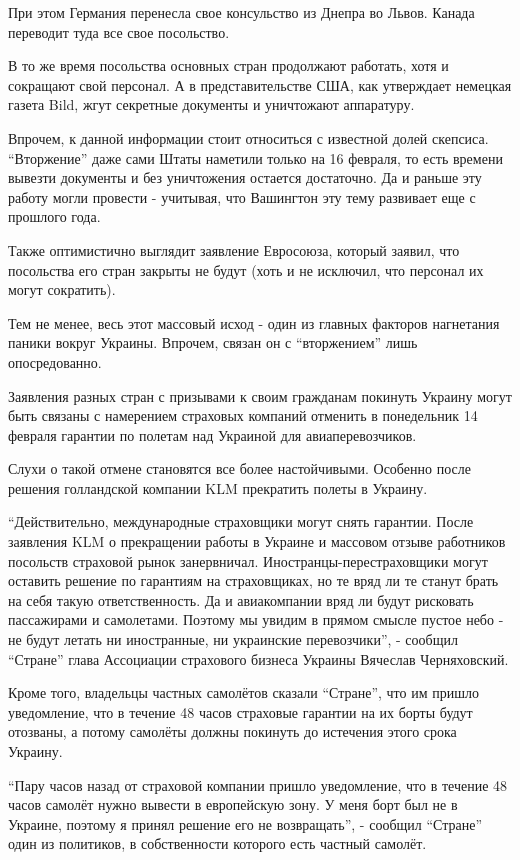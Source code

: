 При этом Германия перенесла свое консульство из Днепра во Львов. Канада
переводит туда все свое посольство.

В то же время посольства основных стран продолжают работать, хотя и сокращают
свой персонал. А в представительстве США, как утверждает немецкая газета Bild,
жгут секретные документы и уничтожают аппаратуру.

Впрочем, к данной информации стоит относиться с известной долей скепсиса.
\enquote{Вторжение} даже сами Штаты наметили только на 16 февраля, то есть
времени вывезти документы и без уничтожения остается достаточно. Да и раньше
эту работу могли провести - учитывая, что Вашингтон эту тему развивает еще с
прошлого года. 

Также оптимистично выглядит заявление Евросоюза, который заявил, что посольства
его стран закрыты не будут (хоть и не исключил, что персонал их могут
сократить). 

Тем не менее, весь этот массовый исход - один из главных факторов нагнетания
паники вокруг Украины. Впрочем, связан он с \enquote{вторжением} лишь опосредованно.

Заявления разных стран с призывами к своим гражданам покинуть Украину могут
быть связаны с намерением страховых компаний отменить в понедельник 14 февраля
гарантии по полетам над Украиной для авиаперевозчиков.

Слухи о такой отмене становятся все более настойчивыми. Особенно после решения
голландской компании KLM прекратить полеты в Украину. 

\enquote{Действительно, международные страховщики могут снять гарантии. После заявления
KLM о прекращении работы в Украине и массовом отзыве работников посольств
страховой рынок занервничал. Иностранцы-перестраховщики могут оставить решение
по гарантиям на страховщиках, но те вряд ли те станут брать на себя такую
ответственность. Да и авиакомпании вряд ли будут рисковать пассажирами и
самолетами. Поэтому мы увидим в прямом смысле пустое небо - не будут летать ни
иностранные, ни украинские перевозчики}, - сообщил \enquote{Стране} глава Ассоциации
страхового бизнеса Украины Вячеслав Черняховский.

Кроме того, владельцы частных самолётов сказали \enquote{Стране}, что им пришло
уведомление, что в течение 48 часов страховые гарантии на их борты будут
отозваны, а потому самолёты должны покинуть до истечения этого срока Украину.

\enquote{Пару часов назад от страховой компании пришло уведомление, что в течение 48
часов самолёт нужно вывести в европейскую зону. У меня борт был не в Украине,
поэтому я принял решение его не возвращать}, - сообщил \enquote{Стране} один из
политиков, в собственности которого есть частный самолёт.

